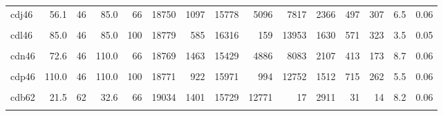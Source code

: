 \begin{landscape}
\begin{ThreePartTable}
\begin{longtable}[t]{lrrrrrrrrrrrrrr}
cdj46 & 56.1 & 46 & 85.0 & 66 & 18750 & 1097 & 15778 & 5096 & 7817 & 2366 & 497 & 307 & 6.5 & 0.06\\
\cellcolor{gray!6}{cdk46} & \cellcolor{gray!6}{68.0} & \cellcolor{gray!6}{46} & \cellcolor{gray!6}{85.0} & \cellcolor{gray!6}{80} & \cellcolor{gray!6}{18760} & \cellcolor{gray!6}{684} & \cellcolor{gray!6}{16200} & \cellcolor{gray!6}{1872} & \cellcolor{gray!6}{12079} & \cellcolor{gray!6}{1709} & \cellcolor{gray!6}{540} & \cellcolor{gray!6}{310} & \cellcolor{gray!6}{4.1} & \cellcolor{gray!6}{0.04}\\
cdl46 & 85.0 & 46 & 85.0 & 100 & 18779 & 585 & 16316 & 159 & 13953 & 1630 & 571 & 323 & 3.5 & 0.05\\
\cellcolor{gray!6}{cdm46} & \cellcolor{gray!6}{44.0} & \cellcolor{gray!6}{46} & \cellcolor{gray!6}{110.0} & \cellcolor{gray!6}{40} & \cellcolor{gray!6}{18739} & \cellcolor{gray!6}{0} & \cellcolor{gray!6}{16865} & \cellcolor{gray!6}{14360} & \cellcolor{gray!6}{0} & \cellcolor{gray!6}{2284} & \cellcolor{gray!6}{218} & \cellcolor{gray!6}{16} & \cellcolor{gray!6}{0.0} & \cellcolor{gray!6}{0.00}\\
cdn46 & 72.6 & 46 & 110.0 & 66 & 18769 & 1463 & 15429 & 4886 & 8083 & 2107 & 413 & 173 & 8.7 & 0.06\\
\cellcolor{gray!6}{cdo46} & \cellcolor{gray!6}{88.0} & \cellcolor{gray!6}{46} & \cellcolor{gray!6}{110.0} & \cellcolor{gray!6}{80} & \cellcolor{gray!6}{18764} & \cellcolor{gray!6}{944} & \cellcolor{gray!6}{15943} & \cellcolor{gray!6}{1694} & \cellcolor{gray!6}{11682} & \cellcolor{gray!6}{1776} & \cellcolor{gray!6}{823} & \cellcolor{gray!6}{242} & \cellcolor{gray!6}{5.6} & \cellcolor{gray!6}{0.06}\\
cdp46 & 110.0 & 46 & 110.0 & 100 & 18771 & 922 & 15971 & 994 & 12752 & 1512 & 715 & 262 & 5.5 & 0.06\\
\cellcolor{gray!6}{cda62} & \cellcolor{gray!6}{13.0} & \cellcolor{gray!6}{62} & \cellcolor{gray!6}{32.6} & \cellcolor{gray!6}{40} & \cellcolor{gray!6}{18942} & \cellcolor{gray!6}{1372} & \cellcolor{gray!6}{15675} & \cellcolor{gray!6}{11125} & \cellcolor{gray!6}{643} & \cellcolor{gray!6}{3877} & \cellcolor{gray!6}{30} & \cellcolor{gray!6}{16} & \cellcolor{gray!6}{8.0} & \cellcolor{gray!6}{0.07}\\
cdb62 & 21.5 & 62 & 32.6 & 66 & 19034 & 1401 & 15729 & 12771 & 17 & 2911 & 31 & 14 & 8.2 & 0.06\\
\cellcolor{gray!6}{cdc62} & \cellcolor{gray!6}{26.1} & \cellcolor{gray!6}{62} & \cellcolor{gray!6}{32.6} & \cellcolor{gray!6}{80} & \cellcolor{gray!6}{19036} & \cellcolor{gray!6}{1258} & \cellcolor{gray!6}{15874} & \cellcolor{gray!6}{12988} & \cellcolor{gray!6}{12} & \cellcolor{gray!6}{2838} & \cellcolor{gray!6}{41} & \cellcolor{gray!6}{10} & \cellcolor{gray!6}{7.3} & \cellcolor{gray!6}{0.06}\\

\end{longtable}
\end{ThreePartTable}
\end{landscape}
